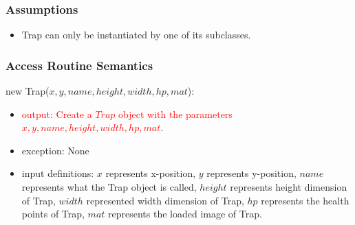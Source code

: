 \documentclass[12pt]{article}
\newcommand{\m}[1]{\mbox{#1}}
\begin{document}





\subsubsection*{Assumptions}

\begin{itemize}
    \item Trap can only be instantiated by one of its subclasses.
\end{itemize}

\subsubsection*{Access Routine Semantics}

new Trap($x, y, name, height, width, hp, mat$):
\begin{itemize}
    \item \textcolor{red}{output: Create a $Trap$ object with the parameters $x, y, name, height, width, hp, mat$.}
    \item exception: None
    \item input definitions: $x$ represents x-position, $y$ represents y-position, $name$ represents what the Trap object is called, $height$ represents height dimension of Trap, $width$ represented width dimension of Trap, $hp$ represents the health points of Trap, $mat$ represents the loaded image of Trap.
\end{itemize}
\end{document}
